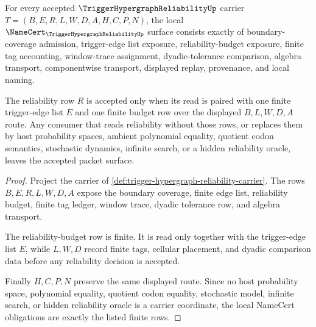 \begin{theorem}
\label{thm:trigger-hypergraph-reliability-namecert-obligations}
For every accepted $\TriggerHypergraphReliabilityUp$ carrier $T=(B,E,R,L,W,D,A,H,C,P,N)$, the local $\NameCert_{\TriggerHypergraphReliabilityUp}$ surface consists exactly of boundary-coverage admission, trigger-edge list exposure, reliability-budget exposure, finite tag accounting, window-trace assignment, dyadic-tolerance comparison, algebra transport, componentwise transport, displayed replay, provenance, and local naming.

The reliability row $R$ is accepted only when its read is paired with one finite trigger-edge list $E$ and one finite budget row over the displayed $B,L,W,D,A$ route. Any consumer that reads reliability without those rows, or replaces them by host probability spaces, ambient polynomial equality, quotient codon semantics, stochastic dynamics, infinite search, or a hidden reliability oracle, leaves the accepted packet surface.
\end{theorem}
\begin{proof}
Project the carrier of \autoref{def:trigger-hypergraph-reliability-carrier}. The rows $B,E,R,L,W,D,A$ expose the boundary coverage, finite edge list, reliability budget, finite tag ledger, window trace, dyadic tolerance row, and algebra transport.

The reliability-budget row is finite. It is read only together with the trigger-edge list $E$, while $L,W,D$ record finite tags, cellular placement, and dyadic comparison data before any reliability decision is accepted.

Finally $H,C,P,N$ preserve the same displayed route. Since no host probability space, polynomial equality, quotient codon equality, stochastic model, infinite search, or hidden reliability oracle is a carrier coordinate, the local NameCert obligations are exactly the listed finite rows.
\end{proof}

